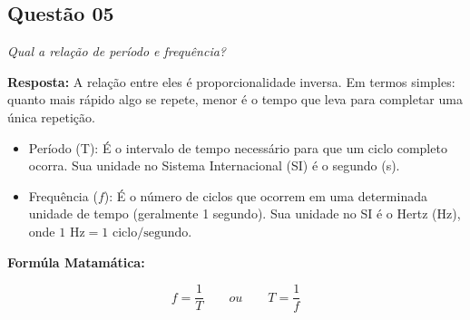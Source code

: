 \subsection*{Questão 05}

\textit{Qual a relação de período e frequência? }

\textbf{Resposta: } 
A relação entre eles é proporcionalidade inversa. Em termos simples: quanto mais rápido algo se repete, menor é o tempo que leva para completar uma única repetição.
\begin{itemize}
    \item Período (T): É o intervalo de tempo necessário para que um ciclo completo ocorra. Sua unidade no Sistema Internacional (SI) é o segundo (s).
    \item Frequência ($f$): É o número de ciclos que ocorrem em uma determinada unidade de tempo (geralmente 1 segundo). Sua unidade no SI é o Hertz (Hz), onde $1\text{ Hz} = 1\text{ ciclo/segundo}$.
\end{itemize}
\textbf{Formúla Matamática:}\par 
$$f = \frac{1}{T} \qquad ou \qquad T = \frac{1}{f}$$